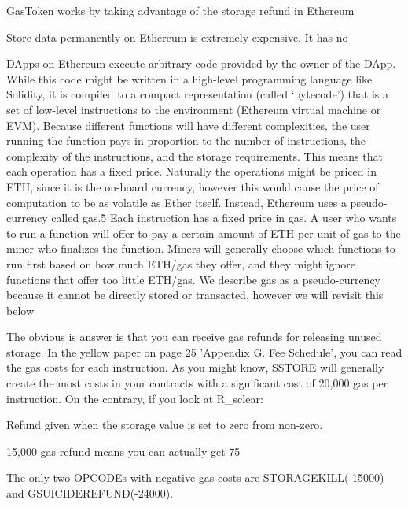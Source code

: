 GasToken works by taking advantage of the storage refund in Ethereum

Store data permanently on Ethereum is extremely expensive. It has no 

DApps on Ethereum execute arbitrary code provided by the owner of the DApp. While this code might be written
in a high-level programming language like Solidity, it is compiled to a compact representation (called ‘bytecode’)
that is a set of low-level instructions to the environment (Ethereum virtual machine or EVM). Because different
functions will have different complexities, the user running the function pays in proportion to the number of
instructions, the complexity of the instructions, and the storage requirements. This means that each operation has a fixed price. Naturally the operations might be priced in ETH, since it is the on-board currency, however this
would cause the price of computation to be as volatile as Ether itself. Instead, Ethereum uses a pseudo-currency
called gas.5 Each instruction has a fixed price in gas. A user who wants to run a function will offer to pay a certain
amount of ETH per unit of gas to the miner who finalizes the function. Miners will generally choose which
functions to run first based on how much ETH/gas they offer, and they might ignore functions that offer too little
ETH/gas. We describe gas as a pseudo-currency because it cannot be directly stored or transacted, however we
will revisit this below



The obvious is answer is that you can receive gas refunds for releasing unused storage. In the yellow paper on page 25 'Appendix G. Fee Schedule', you can read the gas costs for each instruction. As you might know, SSTORE will generally create the most costs in your contracts with a significant cost of 20,000 gas per instruction. On the contrary, if you look at R_sclear:

Refund given when the storage value is set to zero from non-zero.

15,000 gas refund means you can actually get 75%








The only two OPCODEs with negative gas costs are STORAGEKILL(-15000) and GSUICIDEREFUND(-24000).

